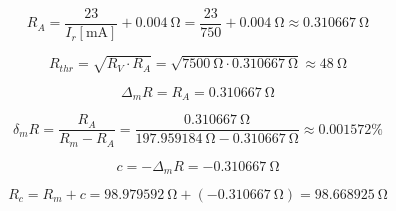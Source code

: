 \begin{equation}
	R_A = \frac{23}{I_r[\unit{\milli\ampere}]} + \SI{0.004}{\ohm} = \frac{23}{750} + \SI{0.004}{\ohm} \approx \SI{0.310667}{\ohm}
\end{equation}

\begin{equation}
	R_{thr} = \sqrt{R_V\cdot R_A} = \sqrt{\SI{7500}{\ohm}\cdot\SI{0.310667}{\ohm}} \approx\SI{48}{\ohm}
\end{equation}

\begin{equation}
	\Delta_m R = R_A = \SI{0.310667}{\ohm}
\end{equation}

\begin{equation}
	\delta_m R = \frac{R_A}{R_m - R_A} = \frac{ \SI{0.310667}{\ohm}}{\SI{197.959184}{\ohm} - \SI{0.310667}{\ohm}} \approx 0.001572\unit{\percent}
\end{equation}

\begin{equation}
	c = -\Delta_m R = - \SI{0.310667}{\ohm}
\end{equation}

\begin{equation}
	R_c = R_m + c =  \SI{98.979592}{\ohm}   + (- \SI{0.310667}{\ohm}) = \SI{98.668925}{\ohm}
	\label{eq:CCMlast}
\end{equation}